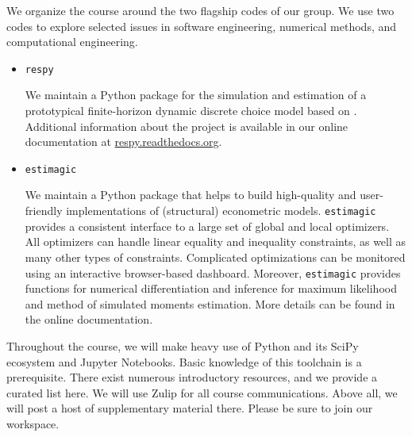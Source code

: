 








\noindent We organize the course around the two flagship codes of our group. We use two codes to explore selected issues in software engineering, numerical methods, and computational engineering.

\begin{itemize}

\item \verb+respy+

We maintain a Python package for the simulation and estimation of a prototypical finite-horizon dynamic discrete choice model based on \citep{Keane.1997}. Additional information about the project is available in our online documentation at \url{respy.readthedocs.org}.

\item \verb+estimagic+

We maintain a Python package that helps to build high-quality and user-friendly implementations of (structural) econometric models. \verb+estimagic+ provides a consistent interface to a large set of global and local optimizers. All optimizers can handle linear equality and inequality constraints, as well as many other types of constraints. Complicated optimizations can be monitored using an interactive browser-based dashboard. Moreover, \verb+estimagic+ provides functions for numerical differentiation and inference for maximum likelihood and method of simulated moments estimation. More details can be found in the online documentation.

\end{itemize}

\noindent Throughout the course, we will make heavy use of Python and its SciPy ecosystem and Jupyter Notebooks. Basic knowledge of this toolchain is a prerequisite. There exist numerous introductory resources, and we provide a curated list here. We will use Zulip for all course communications. Above all, we will post a host of supplementary material there. Please be sure to join our workspace.

